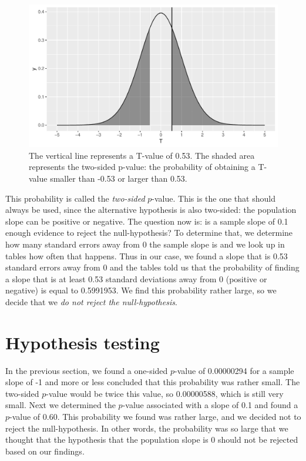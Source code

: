 \documentclass[]{book}\usepackage[]{graphicx}\usepackage[]{color}
\makeatletter
\def\maxwidth{ %
  \ifdim\Gin@nat@width>\linewidth
    \linewidth
  \else
    \Gin@nat@width
  \fi
}
\newenvironment{knitrout}{}{} %
\makeatother
\begin{document}
\begin{knitrout}
\color{fgcolor}\begin{figure}

{\centering \includegraphics[width=\maxwidth]{figure/inf_19-1} 

}

\caption[The vertical line represents a T-value of 0.53]{The vertical line represents a T-value of 0.53. The shaded area represents the two-sided p-value: the probability of obtaining a T-value smaller than -0.53 or larger than 0.53.}\label{fig:inf_19}
\end{figure}


\end{knitrout}

This probability is called the \textit{two-sided} $p$-value. This is the one that should always be used, since the alternative hypothesis is also two-sided: the population slope can be positive or negative. The question now is: is a sample slope of 0.1 enough evidence to reject the null-hypothesis? To determine that, we determine how many standard errors away from 0 the sample slope is and we look up in tables how often that happens. Thus in our case, we found a slope that is 0.53 standard errors away from 0 and the tables told us that the probability of finding a slope that is at least 0.53 standard deviations away from 0 (positive or negative) is equal to 0.5991953. We find this probability rather large, so we decide that we \textit{do not reject the null-hypothesis}.


\section{Hypothesis testing}

In the previous section, we found a one-sided $p$-value of 0.00000294 for a sample slope of -1 and more or less concluded that this probability was rather small. The two-sided $p$-value would be twice this value, so 0.00000588, which is still very small. Next we determined the $p$-value associated with a slope of 0.1 and found a $p$-value of 0.60. This probability we found was rather large, and we decided not to reject the null-hypothesis. In other words, the probability was so large that we thought that the hypothesis that the population slope is 0 should not be rejected based on our findings.
\end{document}
